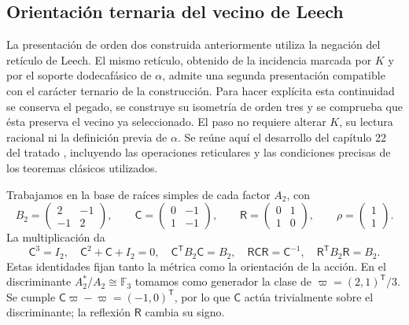 
\subsection{Orientación ternaria del vecino de Leech}
\label{km:orden-tres-reticular}

La presentación de orden dos construida anteriormente utiliza la negación
del retículo de Leech. El mismo retículo, obtenido de la incidencia marcada
por \(K\) y por el soporte dodecafásico de \(\alpha\), admite una segunda
presentación compatible con el carácter ternario de la construcción.
Para hacer explícita esta continuidad se conserva el pegado, se construye
su isometría de orden tres y se comprueba que ésta preserva el vecino ya
seleccionado. El paso no requiere alterar \(K\), su lectura racional ni
la definición previa de \(\alpha\). Se reúne aquí el desarrollo del
capítulo 22 del tratado \cite{hmtintegral}, incluyendo las operaciones
reticulares y las condiciones precisas de los teoremas clásicos utilizados.

Trabajamos en la base de raíces simples de cada factor \(A_2\), con
\begin{equation}
 B_2=\begin{pmatrix}2&-1\\-1&2\end{pmatrix},\qquad
 \mathsf C=\begin{pmatrix}0&-1\\1&-1\end{pmatrix},\qquad
 \mathsf R=\begin{pmatrix}0&1\\1&0\end{pmatrix},\qquad
 \rho=\begin{pmatrix}1\\1\end{pmatrix}.
 \label{km:coxeter-reflexion}
\end{equation}
La multiplicación da
\[
 \mathsf C^3=I_2,\quad
 \mathsf C^2+\mathsf C+I_2=0,\quad
 \mathsf C^{\mathsf T}B_2\mathsf C=B_2,\quad
 \mathsf R\mathsf C\mathsf R=\mathsf C^{-1},\quad
 \mathsf R^{\mathsf T}B_2\mathsf R=B_2.
\]
Estas identidades fijan tanto la métrica como la orientación de la acción.
En el discriminante \(A_2^*/A_2\cong\mathbb F_3\) tomamos como
generador la clase de \(\varpi=(2,1)^{\mathsf T}/3\). Se cumple
\(\mathsf C\varpi-\varpi=(-1,0)^{\mathsf T}\), por lo que
\(\mathsf C\) actúa trivialmente sobre el discriminante; la reflexión
\(\mathsf R\) cambia su signo.

